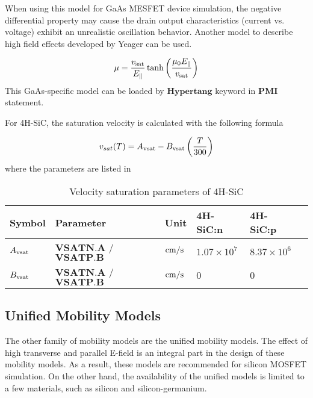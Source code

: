 \documentclass[oneside,12pt]{cgd_book}
\begin{document}
\par
{}When using this model for GaAs MESFET device simulation, the negative differential property
            may cause the drain output characteristics (current vs. voltage) exhibit an unrealistic oscillation
            behavior. Another model to describe high field effects developed by Yeager
\cite[Yeager1986]{} can be used.
\par
\par
\begin{equation}
\mu = \frac{v_{\rm sat} }{ E_{\parallel}} \tanh \left( \frac{\mu _0 E_{\parallel} } {v_{\rm sat}
            } \right)
\end{equation}
This GaAs-specific model can be loaded by $\mathbf{Hypertang}$ keyword in
$\mathbf{PMI}$ statement.
\par
{}For 4H-SiC, the saturation velocity is calculated with the following formula
\par
\par
\begin{equation}
v_{sat} (T) = A_{\rm vsat} - B_{\rm vsat} \left( \frac{T}{300} \right)
\end{equation}
where the parameters are listed in
\par
\begin{longtable}{llllll}
\caption{\label{tab:Equation:Vsat:4HSiC:Param}Velocity saturation parameters of 4H-SiC} \\
\hline
 Symbol
& Parameter
& Unit
& 4H-SiC:n
& 4H-SiC:p\\
\hline
 $A_{\rm vsat}$
& $\mathbf{VSATN.A}$ / $\mathbf{VSATP.B}$
& $\text{cm}\text{/}\text{s}$
& $1.07\times10^{7}$
& $8.37\times10^{6}$
\\
 $B_{\rm vsat}$
& $\mathbf{VSATN.A}$ / $\mathbf{VSATP.B}$
& $\text{cm}\text{/}\text{s}$
& $0$
& $0$\\
\end{longtable}

\subsection{Unified Mobility Models}
The other family of mobility models are the unified mobility models. The effect of high transverse and
        parallel E-field is an integral part in the design of these mobility models. As a result, these models are
        recommended for silicon MOSFET simulation. On the other hand, the availability of the unified models is limited
        to a few materials, such as silicon and silicon-germanium.
\par
\end{document}
